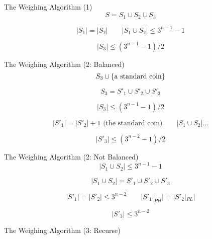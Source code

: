 \begin{frame}{The Weighing Algorithm (1)}
  \[
    S = S_1 \cup S_2 \cup S_3
  \]

  \[
    |S_1| = |S_2| \qquad |S_1 \cup S_2| \le 3^{n-1} - 1 
  \]

  \[
    |S_3| \le (3^{n-1} - 1) / 2
  \]
\end{frame}

\begin{frame}{The Weighing Algorithm (2: Balanced)}
  \[
    S_3 \cup \{\text{a standard coin}\}
  \]

  \[
    S_3 = S'_1 \cup S'_2 \cup S'_3
  \]

  \[
    |S_3| \le (3^{n-1} - 1) / 2
  \]

  \[
    |S'_1| = |S'_2| + 1 \text{ (the standard coin)} \qquad |S_1 \cup S_2| \dots
  \]

  \[
    |S'_3| \le (3^{n-2} - 1) / 2
  \]
\end{frame}

\begin{frame}{The Weighing Algorithm (2: Not Balanced)}
  \[
    |S_1 \cup S_2| \le 3^{n-1} - 1 
  \]

  \[
    |S_1 \cup S_2| = S'_1 \cup S'_2 \cup S'_3
  \]

  \[
    |S'_1| = |S'_2| \le 3^{n-2} \qquad |S'_1|_{PH}| = |S'_2|_{PL}|
  \]

  \[
    |S'_3| \le 3^{n-2}
  \]
\end{frame}

\begin{frame}{The Weighing Algorithm (3: Recurse)}
\end{frame}
